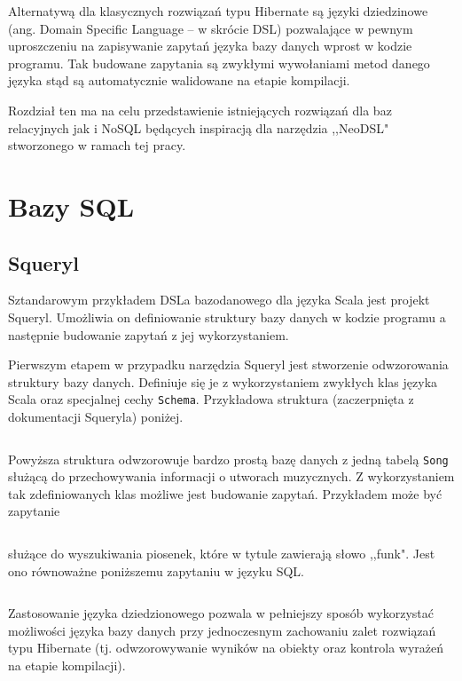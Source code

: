 \documentclass[brudnopis]{xmgr}
\begin{document}
Alternatywą dla klasycznych rozwiązań typu Hibernate są języki dziedzinowe (ang. Domain Specific Language -- w skrócie DSL)  pozwalające w pewnym uproszczeniu na zapisywanie zapytań języka bazy danych wprost w kodzie programu. Tak budowane zapytania są zwykłymi wywołaniami metod danego języka stąd są automatycznie walidowane na etapie kompilacji.

Rozdział ten ma na celu przedstawienie istniejących rozwiązań dla baz relacyjnych jak i NoSQL będących inspiracją dla narzędzia ,,NeoDSL" stworzonego w ramach tej pracy.

\section{Bazy SQL}

\subsection{Squeryl}

Sztandarowym przykładem DSLa bazodanowego dla języka Scala jest projekt Squeryl. Umożliwia on definiowanie struktury bazy danych w kodzie programu a następnie budowanie zapytań z jej wykorzystaniem.

Pierwszym etapem w przypadku narzędzia Squeryl jest stworzenie odwzorowania struktury bazy danych. Definiuje się je z wykorzystaniem zwykłych klas języka Scala oraz specjalnej cechy \texttt{Schema}. Przykładowa struktura (zaczerpnięta z dokumentacji Squeryla\cite{squeryl_schemadefinition}) poniżej.

\inputminted{scala}{listings/scala/squeryl-schema.scala}

Powyższa struktura odwzorowuje bardzo prostą bazę danych z jedną tabelą \texttt{Song} służącą do przechowywania informacji o utworach muzycznych. Z wykorzystaniem tak zdefiniowanych klas możliwe jest budowanie zapytań. Przykładem może być zapytanie

\inputminted{scala}{listings/scala/squeryl-query.scala}

\noindent służące do wyszukiwania piosenek, które w tytule zawierają słowo ,,funk". Jest ono równoważne poniższemu zapytaniu w języku SQL.

\inputminted{sql}{listings/sql/squeryl-query.sql}

Zastosowanie języka dziedzionowego pozwala w pełniejszy sposób wykorzystać możliwości języka bazy danych przy jednoczesnym zachowaniu zalet rozwiązań typu Hibernate (tj. odwzorowywanie wyników na obiekty oraz kontrola wyrażeń na etapie kompilacji).
\end{document}
